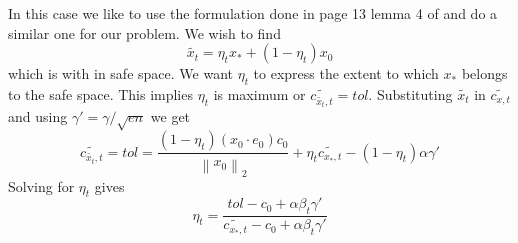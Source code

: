 \documentclass[BTech,thesis]{iitmdiss}
\newcommand{\norm}[1]{\left\lVert#1\right\rVert}
\begin{document}
In this case we like to use the formulation done in page 13 lemma 4 of \cite{pan:pr:sblc} and do a similar one for our problem. We wish to find 
\begin{equation}
    \widetilde{x_t} = \eta_{t} x_* + (1-\eta_{t})x_0 \label{eq:4}
\end{equation}
which is with in safe space. We want $\eta_t$ to express the extent to which $x_*$ belongs to the safe space. This implies $\eta_t$ is maximum or $\widetilde{c_{\widetilde{x_t},t}} = tol$. Substituting $\widetilde{x_t}$ in $\widetilde{c_{x,t}}$ and using $\gamma' = \gamma/\sqrt{en}$ we get
$$ \widetilde{c_{\widetilde{x_t},t}} = tol = \frac{(1-\eta_t)(x_0\cdot e_0)c_0}{\norm{x_0}_2} + \eta_t \widetilde{c_{x_*,t}} - (1-\eta_t)\alpha\gamma' $$
Solving for $\eta_t$ gives
\begin{equation}
    \eta_t = \frac{tol-c_0+\alpha\beta_t\gamma'}{\widetilde{c_{x_*,t}} - c_0+\alpha\beta_t\gamma'} \label{eq:1}
\end{equation}
\end{document}
